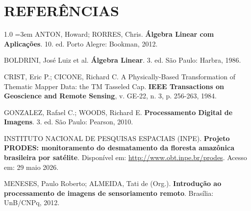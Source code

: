 \documentclass[12pt,a4paper,oneside]{article}
\newenvironment{referencias}{%
  \begin{spacing}{1.0}\setlength{\parindent}{0pt}\setlength{\parskip}{12pt}%
  \sloppy\emergencystretch=3em\RaggedRight}{%
  \end{spacing}}
\begin{document}
\section*{REFERÊNCIAS}
\begin{referencias}
ANTON, Howard; RORRES, Chris. \textbf{Álgebra Linear com Aplicações}. 10. ed. Porto Alegre: Bookman, 2012.

BOLDRINI, José Luiz et al. \textbf{Álgebra Linear}. 3. ed. São Paulo: Harbra, 1986.

CRIST, Eric P.; CICONE, Richard C. A Physically-Based Transformation of Thematic Mapper Data: the TM Tasseled Cap. \textbf{IEEE Transactions on Geoscience and Remote Sensing}, v. GE-22, n. 3, p. 256-263, 1984.

GONZALEZ, Rafael C.; WOODS, Richard E. \textbf{Processamento Digital de Imagens}. 3. ed. São Paulo: Pearson, 2010.

INSTITUTO NACIONAL DE PESQUISAS ESPACIAIS (INPE). \textbf{Projeto PRODES: monitoramento do desmatamento da floresta amazônica brasileira por satélite}. Disponível em: \url{http://www.obt.inpe.br/prodes}. Acesso em: 29 maio 2026.

MENESES, Paulo Roberto; ALMEIDA, Tati de (Org.). \textbf{Introdução ao processamento de imagens de sensoriamento remoto}. Brasília: UnB/CNPq, 2012.
\end{referencias}
\end{document}
